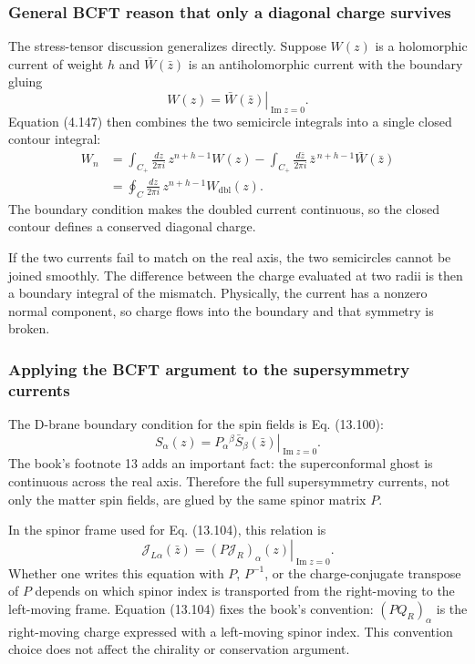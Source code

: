 \documentclass[
  10pt,
  a4paper,
  openany]{book}
\begin{document}
\subsubsection{General BCFT reason that only a diagonal charge
survives}\label{general-bcft-reason-that-only-a-diagonal-charge-survives}

The stress-tensor discussion generalizes directly. Suppose \(W(z)\) is a
holomorphic current of weight \(h\) and \(\bar W(\bar z)\) is an
antiholomorphic current with the boundary gluing \[
\left.
W(z)
=\bar W(\bar z)
\right|_{\operatorname{Im}z=0}.
\] Equation (4.147) then combines the two semicircle integrals into a
single closed contour integral: \[
\begin{aligned}
W_n
&=
\int_{C_+}\frac{dz}{2\pi i}\,
z^{n+h-1}W(z)
-
\int_{C_+}\frac{d\bar z}{2\pi i}\,
\bar z^{\,n+h-1}\bar W(\bar z)\\%
&=
\oint_C\frac{dz}{2\pi i}\,
z^{n+h-1}W_{\mathrm{dbl}}(z).
\end{aligned}
\] The boundary condition makes the doubled current continuous, so the
closed contour defines a conserved diagonal charge.

If the two currents fail to match on the real axis, the two semicircles
cannot be joined smoothly. The difference between the charge evaluated
at two radii is then a boundary integral of the mismatch. Physically,
the current has a nonzero normal component, so charge flows into the
boundary and that symmetry is broken.

\subsubsection{Applying the BCFT argument to the supersymmetry
currents}\label{applying-the-bcft-argument-to-the-supersymmetry-currents}

The D-brane boundary condition for the spin fields is Eq. (13.100): \[
\left.
S_\alpha(z)
=P_\alpha{}^\beta\bar S_\beta(\bar z)
\right|_{\operatorname{Im}z=0}.
\] The book's footnote 13 adds an important fact: the superconformal
ghost is continuous across the real axis. Therefore the full
supersymmetry currents, not only the matter spin fields, are glued by
the same spinor matrix \(P\).

In the spinor frame used for Eq. (13.104), this relation is \[
\left.
\mathcal J_{L\alpha}(\bar z)
=(P\mathcal J_R)_\alpha(z)
\right|_{\operatorname{Im}z=0}.
\] Whether one writes this equation with \(P\), \(P^{-1}\), or the
charge-conjugate transpose of \(P\) depends on which spinor index is
transported from the right-moving to the left-moving frame. Equation
(13.104) fixes the book's convention: \((P Q_R)_\alpha\) is the
right-moving charge expressed with a left-moving spinor index. This
convention choice does not affect the chirality or conservation
argument.
\end{document}
